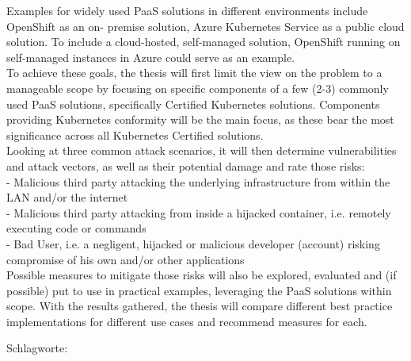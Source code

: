Examples for widely used PaaS solutions in different environments include OpenShift as an on-
premise solution, Azure Kubernetes Service as a public cloud solution. To include a cloud-hosted,
self-managed solution, OpenShift running on self-managed instances in Azure could serve as an
example. \\
To achieve these goals, the thesis will first limit the view on the problem to a manageable scope by
focusing on specific components of a few (2-3) commonly used PaaS solutions, specifically Certified
Kubernetes solutions. Components providing Kubernetes conformity will be the main focus, as these
bear the most significance across all Kubernetes Certified solutions. \\
Looking at three common attack scenarios, it will then determine vulnerabilities and attack vectors,
as well as their potential damage and rate those risks: \\

- Malicious third party attacking the underlying infrastructure from within the LAN and/or the
internet \\

- Malicious third party attacking from inside a hijacked container, i.e. remotely executing code
or commands \\

- Bad User, i.e. a negligent, hijacked or malicious developer (account) risking compromise of
his own and/or other applications \\

Possible measures to mitigate those risks will also be explored, evaluated and (if possible) put to use
in practical examples, leveraging the PaaS solutions within scope. With the results gathered, the
thesis will compare different best practice implementations for different use cases and recommend
measures for each.

\bigskip

\noindent
Schlagworte: 

